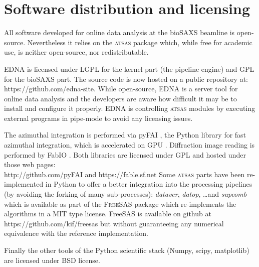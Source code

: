 \documentclass[preprint,pdf]{iucr}              %
\begin{document}





\section{Software distribution and licensing}

All software developed for online data analysis at the bioSAXS beamline is
open-source.
Nevertheless it relies on the \textsc{atsas} package which, while free for
academic use, is neither open-source, nor redistributable.

EDNA is licensed under LGPL for the kernel part (the pipeline engine) and GPL
for the bioSAXS part. The source code is now hosted on a public
repository at:\\https://github.com/edna-site.
While open-source, EDNA is a
server tool for online data analysis and the developers are aware how difficult
it may be to install and configure it properly. EDNA is controlling
\textsc{atsas} modules by executing external programs in pipe-mode to avoid any
licensing issues.

The azimuthal integration is performed via pyFAI \cite{pyFAI}, the Python library
for fast azimuthal integration, which is accelerated on GPU \cite{pyFAI_2015}.
Diffraction image reading is performed by FabIO \cite{fabio}.
Both libraries
are licensed under GPL and hosted under those web pages:\\
http://github.com/pyFAI and https://fable.sf.net
Some \textsc{atsas} parts have been re-implemented in Python to offer a better
integration into the processing pipelines (by avoiding the forking of many
sub-processes): \textit{dataver}, \textit{datop}, \ldots  and
\textit{supcomb} which is available as part of the \textsc{FreeSAS} package
which re-implements the algorithms in a MIT type license. FreeSAS is available
on github at https://github.com/kif/freesas but without guaranteeing any
numerical equivalence with the reference implementation.

Finally the other tools of the Python scientific stack (Numpy, scipy,
matplotlib) are licensed under BSD license.
\end{document}
